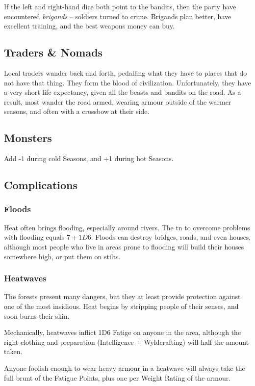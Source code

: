 \begin{multicols}{2}
If the left and right-hand dice both point to the bandits, then the party have encountered \emph{brigands} -- soldiers turned to crime.
Brigands plan better, have excellent training, and the best weapons money can buy.

\subsection{Traders \& Nomads}

Local traders wander back and forth, pedalling what they have to places that do not have that thing.
They form the blood of civilization.
Unfortunately, they have a very short life expectancy, given all the beasts and bandits on the road.
As a result, most wander the road armed, wearing armour outside of the warmer seasons, and often with a crossbow at their side.

\subsection{Monsters}

Add -1 during cold Seasons, and +1 during hot Seasons.

\begin{enumerate}
  \setcounter{enumi}{-1}
\end{enumerate}

\subsection{Complications}

\subsubsection{Floods}

Heat often brings flooding, especially around rivers.
The \gls{tn} to overcome problems with flooding equals $7 + 1D6$.
Floods can destroy bridges, roads, and even houses, although most people who live in areas prone to flooding will build their houses somewhere high, or put them on stilts.

\subsubsection{Heatwaves}

The forests present many dangers, but they at least provide protection against one of the most insidious.
Heat begins by stripping people of their senses, and soon burns their skin.

Mechanically, heatwaves inflict 1D6 Fatige on anyone in the area, although the right clothing and preparation (Intelligence + Wyldcrafting) will half the amount taken.

Anyone foolish enough to wear heavy armour in a heatwave will always take the full brunt of the Fatigue Points, plus one per Weight Rating of the armour.


\end{multicols}
